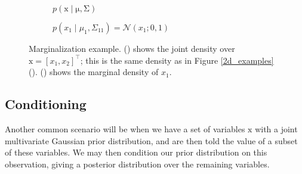 \documentclass{article}
\newcommand{\given}{\mid}
\newcommand{\mc}[1]{\mathcal{#1}}
\newcommand{\trans}{^\top}
\newcommand{\mat}[1]{\bm{\mathrm{#1}}}
\renewcommand{\vec}[1]{\bm{\mathrm{#1}}}
\begin{document}
\begin{figure}
  \centering
  \begin{subfigure}[t]{0.49\textwidth}
    
    \caption{$p(\vec{x} \given \vec{\mu}, \mat{\Sigma})$}
    \label{marginal_2d_pdf}
  \end{subfigure}
  \begin{subfigure}[t]{0.49\textwidth}
    
    \caption{$p(x_1 \given \mu_1, \Sigma_{11}) = \mc{N}(x_1; 0, 1)$}
    \label{marginal_pdf}
  \end{subfigure}
  \caption{Marginalization example.  () shows
    the joint density over $\vec{x} = [x_1, x_2]\trans$; this is the same
    density as in Figure \ref{2d_examples}().
    () shows the marginal density of $x_1$.}
  \label{marginal_example}
\end{figure}

\subsection*{Conditioning}

Another common scenario will be when we have a set of variables
$\vec{x}$ with a joint multivariate Gaussian prior distribution, and
are then told the value of a subset of these variables.  We may then
condition our prior distribution on this observation, giving a
posterior distribution over the remaining variables.
\end{document}
